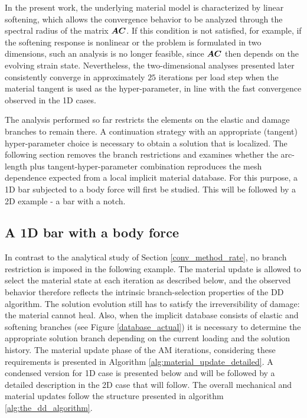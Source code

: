 \documentclass[10pt,review]{cas-sc}
\begin{document}
In the present work, the underlying material model is characterized by linear softening, which allows the convergence behavior to be analyzed through the spectral radius of the matrix 
$ \mbox{\boldmath $A$} \mbox{\boldmath $C$}$. If this condition is not satisfied, for example, if the softening response is nonlinear or the problem is formulated in two dimensions, such an analysis is no longer feasible, since $ \mbox{\boldmath $A$} \mbox{\boldmath $C$}$ then depends on the evolving strain state. Nevertheless, the two-dimensional analyses presented later consistently converge in approximately $25$ iterations per load step when the material tangent is used as the hyper-parameter, in line with the fast convergence observed in the 1D cases.


The analysis performed so far restricts the elements on the elastic and damage branches to remain there. A continuation strategy with an appropriate (tangent) hyper-parameter choice is necessary to obtain a solution that is localized. The following section removes the branch restrictions and examines whether the arc-length plus tangent-hyper-parameter combination reproduces the mesh dependence expected from a local implicit material database. For this purpose, a 1D bar subjected to a body force will first be studied. This will be followed by a 2D example - a bar with a notch. 



\subsection{A 1D bar with a body force\label{1d_bar_with_bf}}
In contrast to the analytical study of Section \ref{conv_method_rate}, no branch restriction is imposed in the following example. The material update is allowed to select the material state at each iteration as described below, and the observed behavior therefore reflects the intrinsic branch-selection properties of the DD algorithm. The solution evolution still has to satisfy the irreversibility of damage: the material cannot heal. Also, when the implicit database consists of elastic and softening branches (see Figure \ref{database_actual}) it is necessary to determine the appropriate solution branch depending on the current loading and the solution history. The material update phase of the AM iterations, considering these requirements is presented in Algorithm \ref{alg:material_update_detailed}. A condensed version for 1D case is presented below and will be followed by a detailed description in the 2D case that will follow. The overall mechanical and material updates follow the structure presented in algorithm \ref{alg:the_dd_algorithm}.
\end{document}
